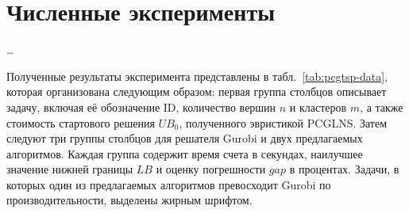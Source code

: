 
\section{Численные эксперименты}
\label{sec:pcgtsp.exp}

\dots

Полученные результаты эксперимента
представлены в табл.~\ref{tab:pcgtsp-data},
которая организована следующим образом:
первая группа столбцов описывает
задачу,
включая её обозначение ID,
количество вершин $n$
и кластеров $m$,
а также стоимость стартового решения $UB_0$,
полученного эвристикой PCGLNS.
Затем следуют три группы столбцов
для решателя Gurobi
и двух предлагаемых алгоритмов.
Каждая группа содержит время
счета в секундах,
наилучшее значение нижней границы
$LB$
и оценку погрешности $gap$
в процентах.
Задачи,
в которых один из предлагаемых
алгоритмов превосходит Gurobi по производительности,
выделены жирным шрифтом.

